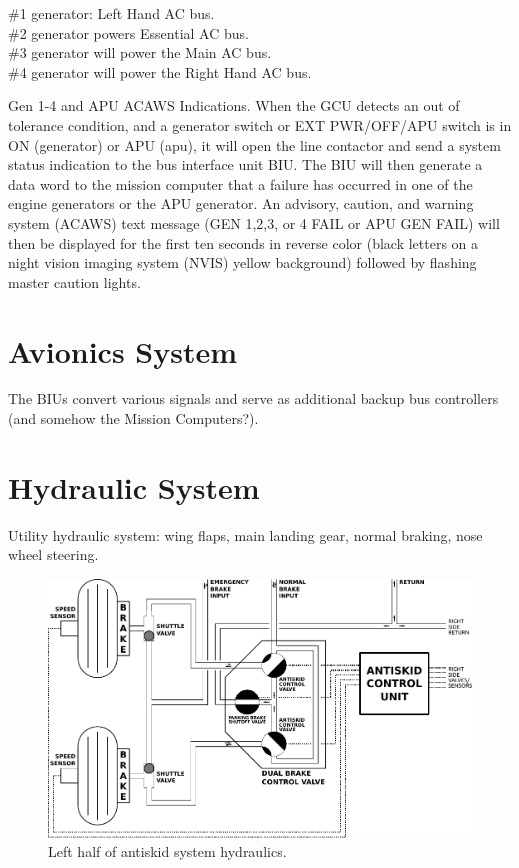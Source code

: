 \#1 generator: Left Hand AC bus.\\
\#2 generator powers Essential AC bus.\\
\#3 generator will power the Main AC bus.\\
\#4 generator will power the Right Hand AC bus.

Gen 1-4 and APU ACAWS Indications. When the GCU detects an out of tolerance condition, and a generator switch or EXT PWR/OFF/APU switch is in ON (generator) or APU (apu), it will open the line contactor and send a system status indication to the bus interface unit BIU. The
BIU will then generate a data word to the mission computer that a failure has occurred in one of the engine generators or the APU generator. An advisory, caution, and warning system (ACAWS) text message (GEN 1,2,3, or 4 FAIL or APU GEN FAIL) will then be displayed for the first ten
seconds in reverse color (black letters on a night vision imaging system (NVIS) yellow background) followed by flashing master caution lights.

\section{Avionics System}

The \gls{BIU}s convert various signals and serve as additional backup bus controllers (and somehow the Mission Computers?).

\newpage
\section{Hydraulic System}

Utility hydraulic system: wing flaps, main landing gear, normal braking, nose wheel steering.

\begin{figure}[h]
  \centering
  \includegraphics[width=\linewidth]{figures/hydraulic/antiskid-system}
  \caption{Left half of antiskid system hydraulics.}
\end{figure}

